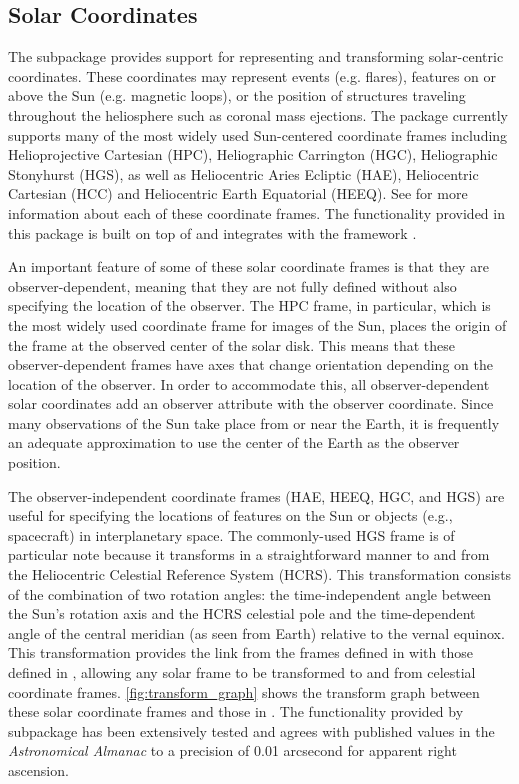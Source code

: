 \subsection{Solar Coordinates}
\label{sec:coords}

The  subpackage provides support for representing and transforming solar-centric coordinates.
These coordinates may represent events (e.g. flares), features on or above the Sun (e.g. magnetic loops), or the position of structures traveling throughout the heliosphere such as coronal mass ejections.
The package currently supports many of the most widely used Sun-centered coordinate frames including Helioprojective Cartesian (HPC), Heliographic Carrington (HGC), Heliographic Stonyhurst (HGS),  as well as Heliocentric Aries Ecliptic (HAE), Heliocentric Cartesian (HCC) and Heliocentric Earth Equatorial (HEEQ).
See \citet{2006A&A...449..791T} for more information about each of these coordinate frames.
The functionality provided in this package is built on top of and integrates with the  framework \citep[see Section 3.3 of][]{astropy2018}.

An important feature of some of these solar coordinate frames is that they are observer-dependent, meaning that they are not fully defined without also specifying the location of the observer.
The HPC frame, in particular, which is the most widely used coordinate frame for images of the Sun, places the origin of the frame at the observed center of the solar disk.
This means that these observer-dependent frames have axes that change orientation depending on the location of the observer.
In order to accommodate this, all observer-dependent solar coordinates add an observer attribute with the observer coordinate.
Since many observations of the Sun take place from or near the Earth, it is frequently an adequate approximation to use the center of the Earth as the observer position.

The observer-independent coordinate frames (HAE, HEEQ, HGC, and HGS) are useful for specifying the locations of features on the Sun or objects (e.g., spacecraft) in interplanetary space.
The commonly-used HGS frame is of particular note because it transforms in a straightforward manner to and from the Heliocentric Celestial Reference System (HCRS).
This transformation consists of the combination of two rotation angles: the time-independent angle between the Sun's rotation axis and the HCRS celestial pole \citep[see][]{2007CeMDA..98..155S} and the time-dependent angle of the central meridian (as seen from Earth) relative to the vernal equinox.
This transformation provides the link from the frames defined in  with those defined in , allowing any solar frame to be transformed to and from celestial coordinate frames.
\autoref{fig:transform_graph} shows the transform graph between these solar coordinate frames and those in \astropy.
The functionality provided by   subpackage has been extensively tested and agrees with published values in the \textit{Astronomical Almanac} to a precision of 0.01 arcsecond for apparent right ascension.

